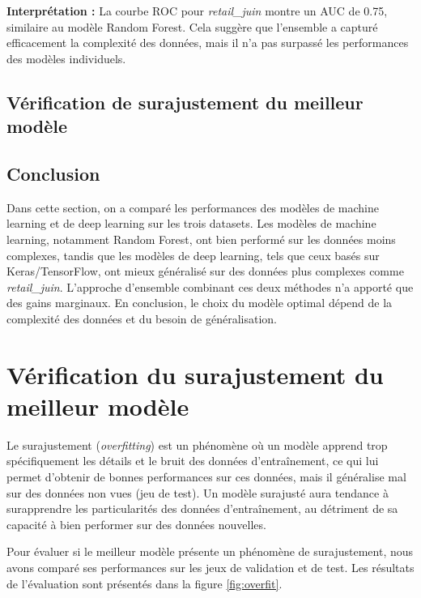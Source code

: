 \textbf{Interprétation :} La courbe ROC pour \textit{retail\_juin} montre un AUC de 0.75, similaire au modèle Random Forest. Cela suggère que l'ensemble a capturé efficacement la complexité des données, mais il n'a pas surpassé les performances des modèles individuels.

\subsection{Vérification de surajustement du meilleur modèle}
\subsection{Conclusion}

Dans cette section, on a comparé les performances des modèles de machine learning et de deep learning sur les trois datasets. Les modèles de machine learning, notamment Random Forest, ont bien performé sur les données moins complexes, tandis que les modèles de deep learning, tels que ceux basés sur Keras/TensorFlow, ont mieux généralisé sur des données plus complexes comme \textit{retail\_juin}. L'approche d'ensemble combinant ces deux méthodes n'a apporté que des gains marginaux. En conclusion, le choix du modèle optimal dépend de la complexité des données et du besoin de généralisation.

\section{Vérification du surajustement du meilleur modèle}

Le surajustement (\textit{overfitting}) est un phénomène où un modèle apprend trop spécifiquement les détails et le bruit des données d'entraînement, ce qui lui permet d'obtenir de bonnes performances sur ces données, mais il généralise mal sur des données non vues (jeu de test). Un modèle surajusté aura tendance à surapprendre les particularités des données d'entraînement, au détriment de sa capacité à bien performer sur des données nouvelles.

Pour évaluer si le meilleur modèle présente un phénomène de surajustement, nous avons comparé ses performances sur les jeux de validation et de test. Les résultats de l'évaluation sont présentés dans la figure \ref{fig:overfit}.

